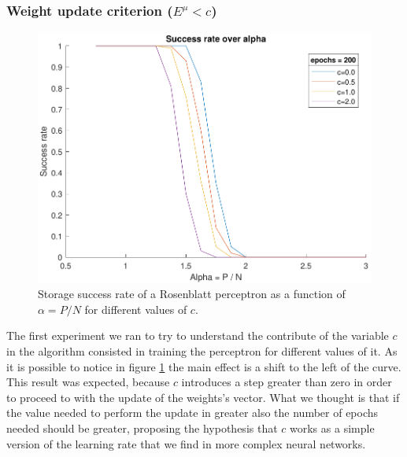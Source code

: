 \subsubsection{Weight update criterion ($E^\mu < c$)}
\begin{figure}[t]
	\centering
	\includegraphics[width=\columnwidth]{figures/bonus_2_c}
    \caption{Storage success rate of a Rosenblatt perceptron as a function of $\alpha = P / N$ for different values of $c$.}
	\label{fig:multiple_c}
\end{figure}
The first experiment we ran to try to understand the contribute of the variable $c$ in the algorithm consisted in training the perceptron for different
values of it. As it is possible to notice in figure \ref{fig:multiple_c} the main effect is a shift to the left of the curve. This result was expected, because
$c$ introduces a step greater than zero in order to proceed to with the update of the weights's vector. What we thought is that if the value needed to perform
the update in greater also the number of epochs needed should be greater, proposing the hypothesis that $c$ works as a simple version of the learning rate that
we find in more complex neural networks.

